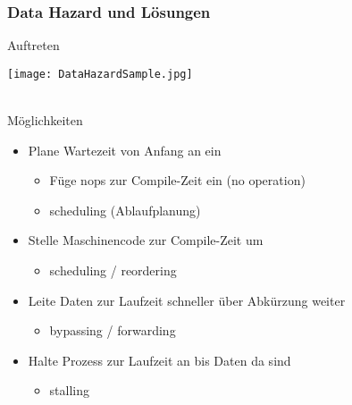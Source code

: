 			\subsubsection{Data Hazard und Lösungen}
				Auftreten \\
				\centerline{\texttt{[image: DataHazardSample.jpg]}} \\

				Möglichkeiten
				\begin{itemize}
					\item Plane Wartezeit von Anfang an ein
							\begin{itemize}
								\item Füge nops zur Compile-Zeit ein (no operation)
								\item scheduling (Ablaufplanung)
							\end{itemize}
					\item Stelle Maschinencode zur Compile-Zeit um
							\begin{itemize}
								\item scheduling / reordering
							\end{itemize}
					\item Leite Daten zur Laufzeit schneller über Abkürzung weiter
							\begin{itemize}
								\item bypassing / forwarding
							\end{itemize}
					\item Halte Prozess zur Laufzeit an bis Daten da sind
							\begin{itemize}
								\item stalling \\
							\end{itemize}
				\end{itemize}
				\vspace{0.5cm}


